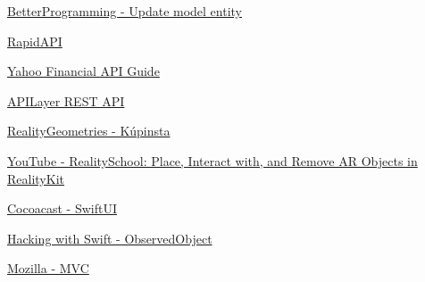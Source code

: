 \documentclass[11pt,a4paper,oneside]{report}
\begin{document}
\hyperlink{https://betterprogramming.pub/how-to-add-text-to-an-arview-in-an-ios-application-tutorial-f3f746f4dc1f}{BetterProgramming - Update model entity}

\hyperlink{https://rapidapi.com/apidojo/api/yahoo-finance1}{RapidAPI}

\hyperlink{https://algotrading101.com/learn/yahoo-finance-api-guide/}{Yahoo Financial API Guide}

\hyperlink{https://apilayer.com/marketplace/exchangerates_data-api}{APILayer REST API}

\hyperlink{https://github.com/maxxfrazer/RealityGeometries}{RealityGeometries - Kúpinsta}

\hyperlink{https://www.youtube.com/watch?v=itGRaAryUxA}{YouTube - RealitySchool: Place, Interact with, and Remove AR Objects in RealityKit}

\hyperlink{https://cocoacasts.com/swiftui-fundamentals-what-is-swiftui}{Cocoacast - SwiftUI}

\hyperlink{https://www.hackingwithswift.com/quick-start/swiftui/how-to-use-observedobject-to-manage-state-from-external-objects}{Hacking with Swift - ObservedObject}

\hyperlink{https://developer.mozilla.org/en-US/docs/Glossary/MVC}{Mozilla - MVC}
\end{document}
